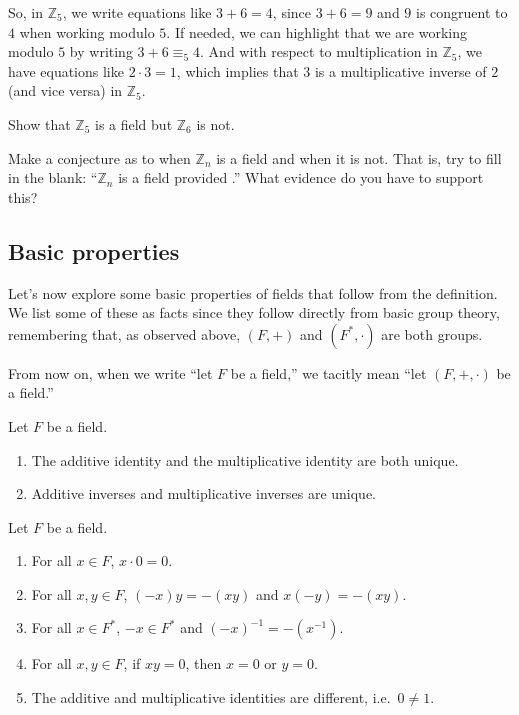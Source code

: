So, in $\mathbb{Z}_5$, we write equations like $3+6 = 4$, since $3+6 = 9$ and $9$ is congruent to $4$ when working modulo $5$. If needed, we can highlight that we are working modulo $5$ by writing  $3+6 \equiv_5 4$. And with respect to multiplication in $\mathbb{Z}_5$, we have equations like $2\cdot3 = 1$, which implies that $3$ is a multiplicative inverse of $2$ (and vice versa) in $\mathbb{Z}_5$.

\begin{problem}
Show that $\mathbb{Z}_5$ is a field but $\mathbb{Z}_6$ is not.
\end{problem}

\begin{problem}\label{prob.ConjectureZn}
Make a conjecture as to when $\mathbb{Z}_n$ is a field and when it is not. That is, try to fill in the blank: ``$\mathbb{Z}_n$ is a field provided .'' What evidence do you have to support this?
\end{problem}

\subsection{Basic properties}

Let's now explore some basic properties of fields that follow from the definition. We list some of these as facts since they follow directly from basic group theory, remembering that, as observed above, $(F,+)$ and $(F^*,\cdot)$ are both groups. 

From now on, when we write ``let $F$ be a field,'' we tacitly mean ``let $(F,+,\cdot)$ be a field.''

\begin{fact}\label{thm.BasicFieldPropsUniqueness}
Let $F$ be a field. 
\begin{enumerate}
\item The additive identity and the multiplicative identity are both unique.
\item Additive inverses and multiplicative inverses are unique.
\end{enumerate}
\end{fact}

\begin{theorem}\label{thm.BasicFieldProps}
Let $F$ be a field. 
\begin{enumerate}
\item For all $x\in F$, $x\cdot0 = 0$.
\item For all $x,y\in F$, $(-x)y = -(xy)$ and $x(-y) = -(xy)$.
\item For all $x\in F^*$, $-x\in F^*$ and $(-x)^{-1} = -(x^{-1})$.
\item\label{thm.BasicFieldProps.NoZeroDivisors} For all $x,y\in F$, if $xy = 0$, then $x=0$ or $y=0$.
\item The additive and multiplicative identities are different, i.e.~$0\neq 1$.
\end{enumerate}
\end{theorem}


